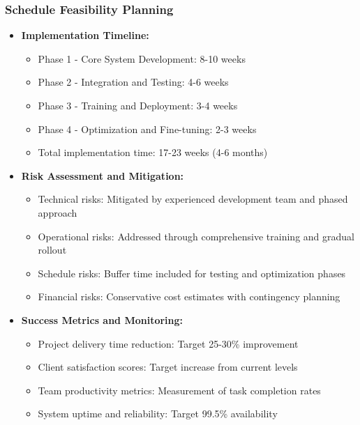 \documentclass[12pt,a4paper]{article}
\begin{document}
\subsubsection{Schedule Feasibility Planning}
\begin{itemize}
    \item \textbf{Implementation Timeline:}
    \begin{itemize}
        \item Phase 1 - Core System Development: 8-10 weeks
        \item Phase 2 - Integration and Testing: 4-6 weeks
        \item Phase 3 - Training and Deployment: 3-4 weeks
        \item Phase 4 - Optimization and Fine-tuning: 2-3 weeks
        \item Total implementation time: 17-23 weeks (4-6 months)
    \end{itemize}
    
    \item \textbf{Risk Assessment and Mitigation:}
    \begin{itemize}
        \item Technical risks: Mitigated by experienced development team and phased approach
        \item Operational risks: Addressed through comprehensive training and gradual rollout
        \item Schedule risks: Buffer time included for testing and optimization phases
        \item Financial risks: Conservative cost estimates with contingency planning
    \end{itemize}
    
    \item \textbf{Success Metrics and Monitoring:}
    \begin{itemize}
        \item Project delivery time reduction: Target 25-30\% improvement
        \item Client satisfaction scores: Target increase from current levels
        \item Team productivity metrics: Measurement of task completion rates
        \item System uptime and reliability: Target 99.5\% availability
    \end{itemize}
\end{itemize}
\end{document}
